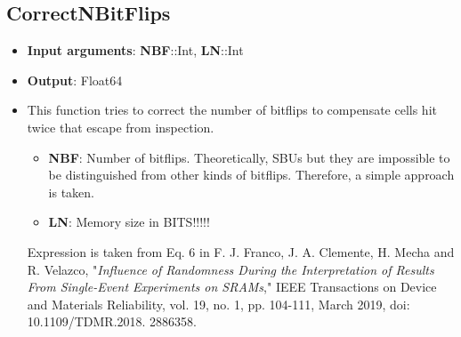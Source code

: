 \subsection*{CorrectNBitFlips}
%
	\begin{itemize}
		\item \textbf{Input arguments}: \textbf{NBF}::Int, \textbf{LN}::Int
		\item \textbf{Output}: Float64
		\item This function tries to correct the number of bitflips to compensate cells hit twice that
		escape from inspection. 
		\begin{itemize}
			\item \textbf{NBF}: Number of bitflips. Theoretically, SBUs but they are impossible to be distinguished 
			from other kinds of bitflips. Therefore, a simple approach is taken.
			\item \textbf{LN}: Memory size in BITS!!!!!
		\end{itemize}	 
		 Expression is taken from Eq. 6 in F. J. Franco, J. A. Clemente, H. Mecha and R. Velazco, 
		 "\textit{Influence of Randomness During the Interpretation of Results From Single-Event Experiments 
		 on SRAMs}," IEEE Transactions on Device and Materials Reliability, vol. 19, no. 1, pp. 104-111, 
		 March 2019, doi: 10.1109/TDMR.2018.
		 2886358.		
	\end{itemize}
%
